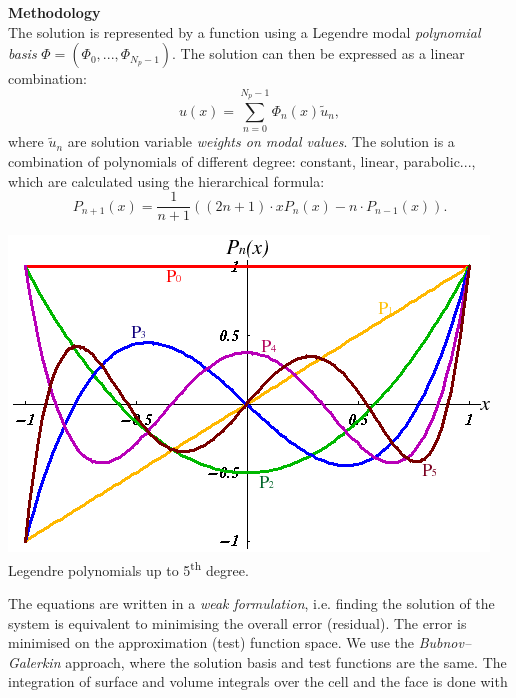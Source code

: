 \documentclass[b1b,portrait]{b0poster}
\begin{document}
\begin{minipage}[t][79cm][t]{0.3\linewidth}
  \vspace{0.5cm}
  \large
  \textcolor{fsbBlue}{%
    \Large \bfseries
    Methodology
  }\\
The solution is represented by a function using a Legendre modal
\textit{polynomial basis} $\Phi = (\Phi_0,...,\Phi_{N_p-1})$. The solution can
then be expressed as a linear combination:
\begin{equation}
u(x) = \sum_{n=0}^{N_p-1}{\Phi_n(x)}\tilde{u}_n,
\nonumber
\end{equation}
where $\tilde{u}_n$ are solution variable \textit{weights on modal values}.
The solution is a
combination of polynomials of different degree: constant, linear,
parabolic...,
which are calculated using the hierarchical formula:
\begin{equation}
P_{n+1}(x) = \frac{1}{n+1}((2n+1) \cdot x P_n(x) - n \cdot P_{n-1}(x)).
\nonumber
\end{equation}
\begin{center}
 \includegraphics[keepaspectratio, width=0.99\columnwidth]{figures/LegendrePPlot.png}
\small Legendre polynomials up to 5\textsuperscript{th} degree.
\end{center}
The equations are written in a \textit{weak formulation}, i.e. finding the
solution of the system is equivalent to minimising the overall error (residual).
The error is minimised on the approximation (test) function space. We use the
\textit{Bubnov--Galerkin} approach, where the solution basis and test functions
are the same. The integration of surface and volume integrals over the cell and
the face is done with

\end{minipage}
\end{document}
